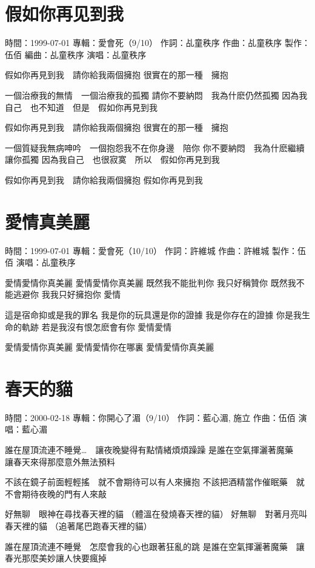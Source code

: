 \documentclass[UTF8,a4paper,oneside,twocolumn,12pt]{ctexbook}
\newcommand{\infopair}[2]{\textbullet #1：#2}
\newcommand{\zc}[1][伍佰]{\infopair{作詞}{#1}}
\newcommand{\zq}[1][伍佰]{\infopair{作曲}{#1}}
\newcommand{\bq}[1][伍佰]{\infopair{編曲}{#1}}
\newcommand{\zj}[1]{\infopair{專輯}{#1}}
\newcommand{\zz}[1]{\infopair{製作}{#1}}
\newcommand{\sj}[1]{\infopair{時間}{#1}}
\newenvironment{info}{\begin{flushleft}\kaishu
	}
	{\end{flushleft}\normalsize\yahei\par}
\newenvironment{lyric}{
	}
{}
\begin{document}
\section{假如你再见到我}
\begin{info}
	\sj{1999-07-01}
	\zj{愛會死（9/10）}
	\zc[乩童秩序]
	\zq[乩童秩序]
	\zz{伍佰}
	\bq[乩童秩序]
	\infopair{演唱}{乩童秩序}
\end{info}
\begin{lyric}
	假如你再見到我　請你給我兩個擁抱
	很實在的那一種　擁抱

	一個治療我的無情　一個治療我的孤獨
	請你不要納悶　我為什麽仍然孤獨
	因為我自己　也不知道　但是　假如你再見到我

	假如你再見到我　請你給我兩個擁抱
	很實在的那一種　擁抱

	一個質疑我無病呻吟　一個抱怨我不在你身邊　陪你
	你不要納悶　我為什麽繼續讓你孤獨
	因為我自己　也很寂寞　所以　假如你再見到我

	假如你再見到我　請你給我兩個擁抱
	假如你再見到我
\end{lyric}

\section{愛情真美麗}
\begin{info}
	\sj{1999-07-01}
	\zj{愛會死（10/10）}
	\zc[許維城]
	\zq[許維城]
	\zz{伍佰}
	\infopair{演唱}{乩童秩序}
\end{info}
\begin{lyric}
	愛情愛情你真美麗
	愛情愛情你真美麗
	既然我不能批判你
	我只好稱贊你
	既然我不能逃避你
	我我只好擁抱你
	愛情

	這是宿命抑或是我的罪名
	我是你的玩具還是你的證據
	我是你存在的證據
	你是我生命的軌跡
	若是我沒有恨怎麽會有你
	愛情愛情

	愛情愛情你真美麗
	愛情愛情你在哪裏
	愛情愛情你真美麗
\end{lyric}

\section{春天的貓}
\begin{info}
	\sj{2000-02-18}
	\zj{你開心了湄（9/10）}
	\zc[藍心湄, 施立]
	\zq
	\infopair{演唱}{藍心湄}
\end{info}
\begin{lyric}
	誰在屋頂流連不睡覺…　讓夜晚變得有點情緒煩煩躁躁
	是誰在空氣揮灑著魔藥　讓春天來得那麼意外無法預料

	不該在鏡子前面輕輕搖　就不會期待可以有人來擁抱
	不該把酒精當作催眠藥　就不會期待夜晚的門有人來敲

	好無聊　眼神在尋找春天裡的貓 （體溫在發燒春天裡的貓）
	好無聊　對著月亮叫春天裡的貓 （追著尾巴跑春天裡的貓）

	誰在屋頂流連不睡覺　怎麼會我的心也跟著狂亂的跳
	是誰在空氣揮灑著魔藥　讓春光那麼美妙讓人快要瘋掉
\end{lyric}
\end{document}
